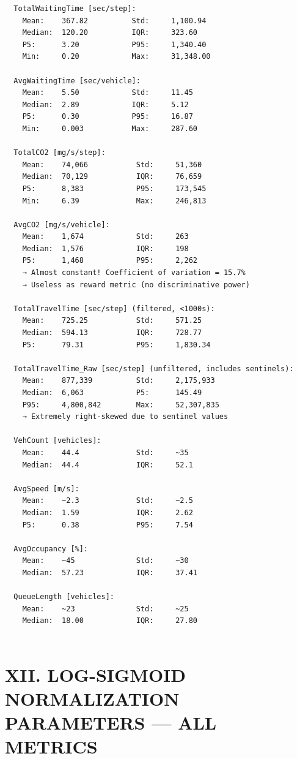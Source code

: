 \documentclass[11pt,a4paper]{article}
\begin{document}
\vspace{1em}\begin{verbatim}
  TotalWaitingTime [sec/step]:
    Mean:    367.82          Std:     1,100.94
    Median:  120.20          IQR:     323.60
    P5:      3.20            P95:     1,340.40
    Min:     0.20            Max:     31,348.00

  AvgWaitingTime [sec/vehicle]:
    Mean:    5.50            Std:     11.45
    Median:  2.89            IQR:     5.12
    P5:      0.30            P95:     16.87
    Min:     0.003           Max:     287.60

  TotalCO2 [mg/s/step]:
    Mean:    74,066           Std:     51,360
    Median:  70,129           IQR:     76,659
    P5:      8,383            P95:     173,545
    Min:     6.39             Max:     246,813

  AvgCO2 [mg/s/vehicle]:
    Mean:    1,674            Std:     263
    Median:  1,576            IQR:     198
    P5:      1,468            P95:     2,262
    → Almost constant! Coefficient of variation = 15.7%
    → Useless as reward metric (no discriminative power)

  TotalTravelTime [sec/step] (filtered, <1000s):
    Mean:    725.25           Std:     571.25
    Median:  594.13           IQR:     728.77
    P5:      79.31            P95:     1,830.34

  TotalTravelTime_Raw [sec/step] (unfiltered, includes sentinels):
    Mean:    877,339          Std:     2,175,933
    Median:  6,063            P5:      145.49
    P95:     4,800,842        Max:     52,307,835
    → Extremely right-skewed due to sentinel values

  VehCount [vehicles]:
    Mean:    44.4             Std:     ~35
    Median:  44.4             IQR:     52.1

  AvgSpeed [m/s]:
    Mean:    ~2.3             Std:     ~2.5
    Median:  1.59             IQR:     2.62
    P5:      0.38             P95:     7.54

  AvgOccupancy [%]:
    Mean:    ~45              Std:     ~30
    Median:  57.23            IQR:     37.41

  QueueLength [vehicles]:
    Mean:    ~23              Std:     ~25
    Median:  18.00            IQR:     27.80


\end{verbatim}
\section*{XII. LOG-SIGMOID NORMALIZATION PARAMETERS — ALL METRICS}
\end{document}
